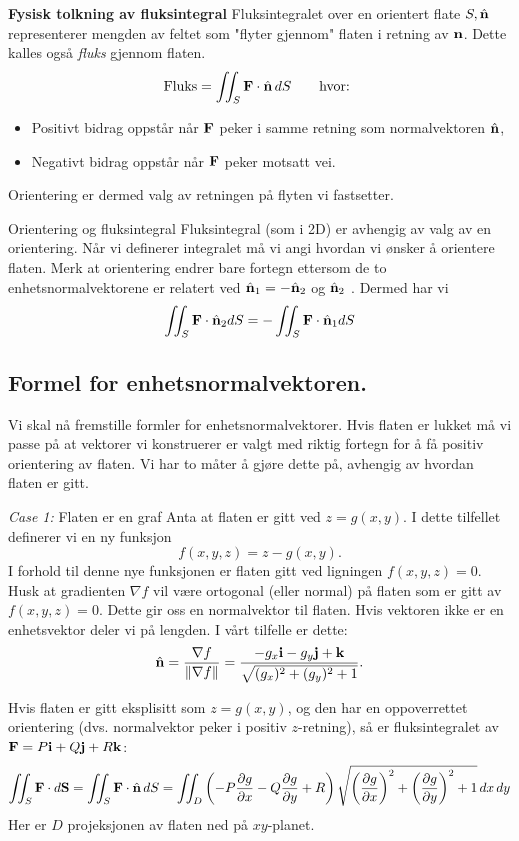 \textbf{Fysisk tolkning av fluksintegral} Fluksintegralet over en orientert flate $S, \hat{\mathbf{n}}$ representerer mengden av feltet som "flyter gjennom" flaten i retning av $\mathbf{n}$. Dette kalles også \emph{fluks} gjennom flaten.
\[
\text{Fluks} = \iint_S \mathbf{F} \cdot \hat{\mathbf{n}}\, dS \qquad \text{hvor: }
\]
\begin{itemize}
\item Positivt bidrag oppstår når \( \mathbf{F} \) peker i samme retning som normalvektoren $\hat{\mathbf{n}}$,
\item Negativt bidrag oppstår når \( \mathbf{F} \) peker motsatt vei.
\end{itemize}
Orientering er dermed valg av retningen på flyten vi fastsetter. 
%
\begin{rem}{Orientering og fluksintegral}
Fluksintegral (som i 2D) er avhengig av valg av en orientering. Når vi definerer integralet må vi angi hvordan vi ønsker å orientere flaten. Merk at orientering endrer bare fortegn ettersom de to enhetsnormalvektorene er relatert ved $\hat{\mathbf{n}}_1=-\hat{\mathbf{n}}_2$ og $\hat{\mathbf{n}}_2$ . Dermed har vi 
\[\iint_S \mathbf{F} \cdot \hat{\mathbf{n}}_2 dS = -\iint_S \mathbf{F} \cdot \hat{\mathbf{n}}_1 dS \]
\end{rem}

%
\subsection*{Formel for enhetsnormalvektoren.} Vi skal nå fremstille formler for enhetsnormalvektorer. 
Hvis flaten er lukket må vi passe på at vektorer vi konstruerer er valgt med riktig fortegn for å få positiv orientering av flaten. 
Vi har to måter å gjøre dette på, avhengig av hvordan flaten er gitt.

\begin{oppsum}{\emph{Case 1:} Flaten er en graf} Anta at flaten er gitt ved $z = g(x, y)$. I dette tilfellet definerer vi en ny funksjon
\[
f(x, y, z) = z - g(x, y).
\]
I forhold til denne nye funksjonen er flaten gitt ved ligningen $f(x, y, z) = 0$. Husk at gradienten $\nabla f$ vil være ortogonal (eller normal) på flaten som er gitt av $f(x, y, z) = 0$. Dette gir oss en normalvektor til flaten. Hvis vektoren ikke er en enhetsvektor deler vi på lengden. I vårt tilfelle er dette:
\[
\hat{\mathbf{n}} = \frac{\nabla f}{\|\nabla f\|} = \frac{-g_x \mathbf{i} - g_y \mathbf{j} + \mathbf{k}}{\sqrt{(g_x)^2 + (g_y)^2 + 1}}.
\]

Hvis flaten er gitt eksplisitt som \( z = g(x, y) \), og den har en oppoverrettet orientering (dvs. normalvektor peker i positiv \( z \)-retning), så er fluksintegralet av $\mathbf{F}=P\mathbf{i}+Q\mathbf{j}+R\mathbf{k}$:
\[
\iint_S \mathbf{F}\cdot d\mathbf{S}=\iint_S \mathbf{F} \cdot \hat{\mathbf{n}}\, dS = \iint_D \left( -P \frac{\partial g}{\partial x} - Q \frac{\partial g}{\partial y} + R \right) \sqrt{ \left( \frac{\partial g}{\partial x} \right)^2 + \left( \frac{\partial g}{\partial y} \right)^2 + 1 }\, dx\, dy
\]
Her er \( D \) projeksjonen av flaten ned på \( xy \)-planet.
\end{oppsum}

